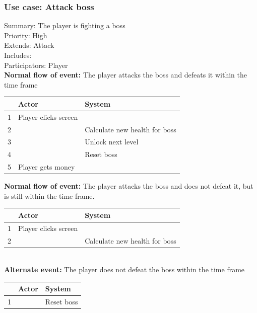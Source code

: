 \documentclass{article}
\begin{document}
\subsubsection{Use case: Attack boss}
Summary: The player is fighting a boss \\
Priority: High \\
Extends: Attack\\
Includes: \\
Participators: Player \\
\textbf{Normal flow of event:} The player attacks the boss and defeats it within the time frame 
\vspace{1 mm}\\
\begin{tabular}{|c|l|l|} \hline
    & Actor & System \\ \hline
    1 & Player clicks screen & \\ \hline
    2 & & Calculate new health for boss \\ \hline
    3 & & Unlock next level \\ \hline
    4 & & Reset boss \\ \hline
    5 & Player gets money & \\ \hline
\end{tabular}
\newpage
\noindent
\textbf{Normal flow of event:} The player attacks the boss and does not defeat it, but is still within the time frame. 
\vspace{1 mm}\\
\begin{tabular}{|c|l|l|} \hline
    & Actor & System \\ \hline
    1 & Player clicks screen & \\ \hline
    2 & & Calculate new health for boss \\ \hline
\end{tabular}
\vspace{5 mm}\\
\textbf{Alternate event:} The player does not defeat the boss within the time frame 
\vspace{1 mm}\\
\begin{tabular}{|c|l|l|} \hline
    & Actor & System \\ \hline
    1 & & Reset boss \\ \hline
\end{tabular}

\vspace{5 mm}\\ 
\end{document}
